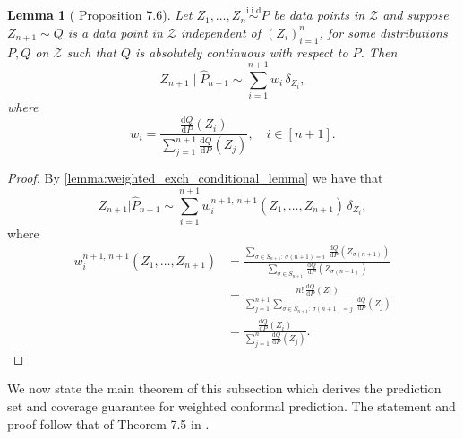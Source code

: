 \documentclass[11pt, titlepage]{article} %
\newcommand{\R}{\mathrm}
\numberwithin{equation}{section}
\newtheorem{lemma}{Lemma}
\theoremstyle{definition}
\numberwithin{theorem}{section}
\numberwithin{lemma}{section}
\numberwithin{corollary}{section}
\numberwithin{proposition}{section}
\numberwithin{definition}{section}
\numberwithin{remark}{section}
\begin{document}
\begin{lemma}[\cite{angelopoulos2024theoreticalfoundationsconformalprediction} Proposition 7.6]
    Let \(Z_1, \ldots, Z_n \overset{\R{i.i.d}}{\sim} P \) be data points in \(\mathcal{Z}\) and suppose \(Z_{n+1} \sim Q\) is a data point in \(\mathcal{Z}\) independent of \((Z_i)_{i=1}^n\), for some distributions \(P, Q\) on \(\mathcal{Z}\) such that \(Q\) is absolutely continuous with respect to \(P\). Then \[Z_{n+1} \mid \hat{P}_{n+1} \sim \sum_{i=1}^{n+1} w_i \, \delta_{Z_i},\] where \begin{equation}
        w_i = \frac{ \frac{\R{d}Q}{\R{d}P}(Z_i)  }{ \sum_{j=1}^{n+1}  \frac{\R{d}Q}{\R{d}P}(Z_j) }, \quad i \in [n+1].
    \label{eqn:weighted_CP_weights}
    \end{equation}
\label{lemma:dist_shift_empirical_dist}
\end{lemma}
\begin{proof}
    By \cref{lemma:weighted_exch_conditional_lemma} we have that \[Z_{n+1} | \hat{P}_{n+1} \sim \sum_{i=1}^{n+1} w_{i}^{n+1, \, n+1}(Z_1, \ldots, Z_{n+1}) \, \delta_{Z_i},\] where \begin{align*}
        w_{i}^{n+1, \, n+1}(Z_1, \ldots, Z_{n+1}) &= 
        \frac{\sum_{\sigma \in S_{n+1}: \ \sigma(n+1) = i} \ \frac{\R{d}Q}{\R{d}P}(Z_{\sigma(n+1)}) }{\sum_{\sigma \in S_{n+1}} \, \frac{\R{d}Q}{\R{d}P}(Z_{\sigma(n+1)}) } \\
        &= \frac{n! \, \frac{\R{d}Q}{\R{d}P}(Z_i)}{\sum_{j=1}^{n+1} \sum_{\sigma \in S_{n+1}: \ \sigma(n+1)=j} \ \frac{\R{d}Q}{\R{d}P}(Z_j) } \\
        &= \frac{\frac{\R{d}Q}{\R{d}P}(Z_i)}{\sum_{j=1}^{n} \frac{\R{d}Q}{\R{d}P}(Z_j)}.
    \end{align*}
\end{proof}

\noindent
We now state the main theorem of this subsection which derives the prediction set and coverage guarantee for weighted conformal prediction. The statement and proof follow that of Theorem 7.5 in \cite{angelopoulos2024theoreticalfoundationsconformalprediction}.
\end{document}
